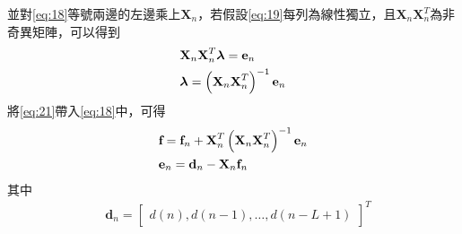 \documentclass[conference]{IEEEtran}
\begin{document}
    並對\eqref{eq:18}等號兩邊的左邊乘上$\textbf{X}_n$，若假設\eqref{eq:19}每列為線性獨立，且$\textbf{X}_n\textbf{X}^T_n$為非奇異矩陣，可以得到
    \begin{align}\label{eq:21}
        &\textbf{X}_n\textbf{X}^T_n\boldsymbol{\lambda}=\textbf{e}_n \notag \\
        &\boldsymbol{\lambda}=\left( \textbf{X}_n\textbf{X}^T_n \right)^{-1} \textbf{e}_n
    \end{align}
    將\eqref{eq:21}帶入\eqref{eq:18}中，可得
    \begin{align}\label{eq:22}
        &\textbf{f}=\textbf{f}_n+\textbf{X}^T_n\left( \textbf{X}_n\textbf{X}^T_n \right)^{-1} \textbf{e}_n \notag \\
        &\textbf{e}_n=\textbf{d}_n-\textbf{X}_n\textbf{f}_n
    \end{align}
    其中
    \begin{align}\label{eq:23}
        &\textbf{d}_n=
        \begin{bmatrix}
            d\left( n \right), d\left( n-1 \right), \ldots, d\left( n-L+1 \right)
        \end{bmatrix}^T
    \end{align}
    
\end{document}
